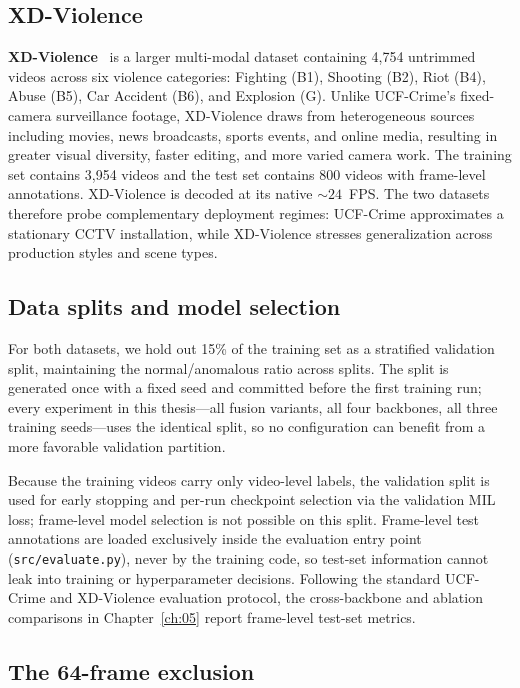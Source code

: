 \subsection{XD-Violence}

\textbf{XD-Violence}~\cite{wu2020xdviolence} is a larger multi-modal dataset
containing 4,754 untrimmed videos across six violence categories: Fighting
(B1), Shooting (B2), Riot (B4), Abuse (B5), Car Accident (B6), and Explosion
(G). Unlike UCF-Crime's fixed-camera surveillance footage, XD-Violence draws
from heterogeneous sources including movies, news broadcasts, sports events,
and online media, resulting in greater visual diversity, faster editing, and
more varied camera work. The training set contains 3,954 videos and the test
set contains 800 videos with frame-level annotations. XD-Violence is decoded
at its native ${\sim}24$~FPS. The two datasets therefore probe complementary
deployment regimes: UCF-Crime approximates a stationary CCTV installation,
while XD-Violence stresses generalization across production styles and scene
types.

\subsection{Data splits and model selection}

For both datasets, we hold out 15\% of the training set as a stratified
validation split, maintaining the normal/anomalous ratio across splits. The
split is generated once with a fixed seed and committed before the first
training run; every experiment in this thesis---all fusion variants, all four
backbones, all three training seeds---uses the identical split, so no
configuration can benefit from a more favorable validation partition.

Because the training videos carry only video-level labels, the validation
split is used for early stopping and per-run checkpoint selection via the
validation MIL loss; frame-level model selection is not possible on this
split. Frame-level test annotations are loaded exclusively inside the
evaluation entry point (\texttt{src/evaluate.py}), never by the training code,
so test-set information cannot leak into training or hyperparameter decisions.
Following the standard UCF-Crime and XD-Violence evaluation protocol, the
cross-backbone and ablation comparisons in Chapter~\ref{ch:05} report
frame-level test-set metrics.

\subsection{The 64-frame exclusion}

